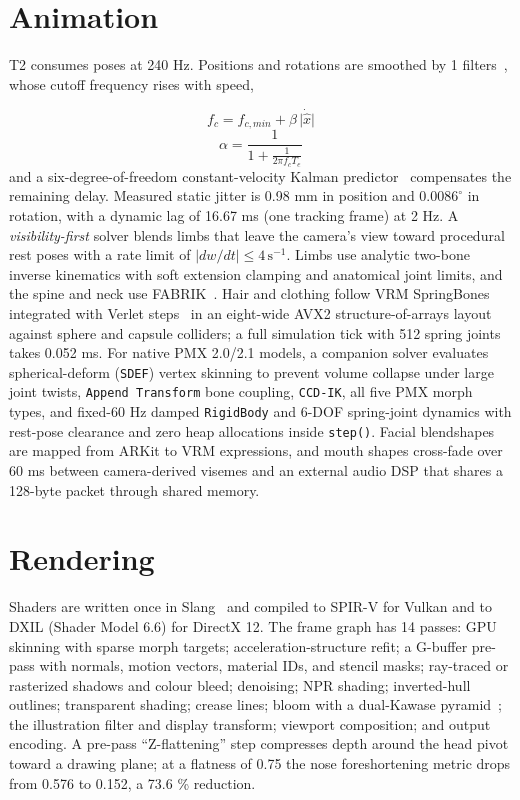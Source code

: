 \documentclass[conference]{IEEEtran}
\begin{document}
\section{Animation}
T2 consumes poses at 240 Hz. Positions and rotations are smoothed by 1\texteuro{} filters~\cite{oneeuro}, whose cutoff frequency rises with speed,

\begin{equation}
f_c = f_{c,min} + \beta\,\lvert\dot{\hat{x}}\rvert
\label{eq:oneeuro}
\end{equation}
\begin{equation}
\alpha = \frac{1}{1 + \frac{1}{2\pi f_c T_e}}
\label{eq:oneeuro-alpha}
\end{equation}
and a six-degree-of-freedom constant-velocity Kalman predictor~\cite{kalman} compensates the remaining delay. Measured static jitter is 0.98 mm in position and $0.0086^\circ$ in rotation, with a dynamic lag of 16.67 ms (one tracking frame) at 2 Hz. A \textit{visibility-first} solver blends limbs that leave the camera's view toward procedural rest poses with a rate limit of $|dw/dt| \le 4\,\mathrm{s}^{-1}$. Limbs use analytic two-bone inverse kinematics with soft extension clamping and anatomical joint limits, and the spine and neck use FABRIK~\cite{fabrik}. Hair and clothing follow VRM SpringBones integrated with Verlet steps~\cite{jakobsen} in an eight-wide AVX2 structure-of-arrays layout against sphere and capsule colliders; a full simulation tick with 512 spring joints takes 0.052 ms. For native PMX 2.0/2.1 models, a companion solver evaluates spherical-deform (\texttt{SDEF}) vertex skinning to prevent volume collapse under large joint twists, \texttt{Append Transform} bone coupling, \texttt{CCD-IK}, all five PMX morph types, and fixed-60 Hz damped \texttt{RigidBody} and 6-DOF spring-joint dynamics with rest-pose clearance and zero heap allocations inside \texttt{step()}. Facial blendshapes are mapped from ARKit to VRM expressions, and mouth shapes cross-fade over 60 ms between camera-derived visemes and an external audio DSP that shares a 128-byte packet through shared memory.


\section{Rendering}
Shaders are written once in Slang~\cite{slang} and compiled to SPIR-V for Vulkan and to DXIL (Shader Model 6.6) for DirectX 12. The frame graph has 14 passes: GPU skinning with sparse morph targets; acceleration-structure refit; a G-buffer pre-pass with normals, motion vectors, material IDs, and stencil masks; ray-traced or rasterized shadows and colour bleed; denoising; NPR shading; inverted-hull outlines; transparent shading; crease lines; bloom with a dual-Kawase pyramid~\cite{bjorge}; the illustration filter and display transform; viewport composition; and output encoding. A pre-pass ``Z-flattening'' step compresses depth around the head pivot toward a drawing plane; at a flatness of 0.75 the nose foreshortening metric drops from 0.576 to 0.152, a 73.6 \% reduction.
\end{document}
